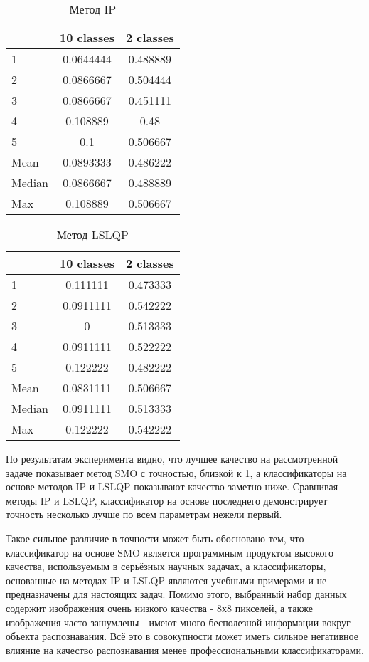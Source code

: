 \begin{table}[H]
    \centering
    \begin{tabular}{|l||c|c|}
        \hline
        & 10 classes & 2 classes \\\hline\hline
        1 & 0.0644444 & 0.488889 \\\hline
        2 & 0.0866667 & 0.504444 \\\hline
        3 & 0.0866667 & 0.451111 \\\hline
        4 & 0.108889 & 0.48 \\\hline
        5 & 0.1 & 0.506667 \\\hline
        Mean & 0.0893333 & 0.486222 \\\hline
        Median & 0.0866667 & 0.488889 \\\hline
        Max & 0.108889 & 0.506667 \\\hline
    \end{tabular}
    \caption{Метод IP}
\end{table}

\begin{table}[H]
    \centering
    \begin{tabular}{|l||c|c|}
        \hline
        & 10 classes & 2 classes \\\hline\hline
        1 & 0.111111 & 0.473333 \\\hline
        2 & 0.0911111 & 0.542222 \\\hline
        3 & 0 & 0.513333 \\\hline
        4 & 0.0911111 & 0.522222 \\\hline
        5 & 0.122222 & 0.482222 \\\hline
        Mean & 0.0831111 & 0.506667 \\\hline
        Median & 0.0911111 & 0.513333 \\\hline
        Max & 0.122222 & 0.542222 \\\hline
    \end{tabular}
    \caption{Метод LSLQP}
\end{table}

По результатам эксперимента видно, что лучшее качество на рассмотренной задаче показывает метод SMO с точностью, близкой к 1, а классификаторы на основе методов IP и LSLQP показывают качество заметно ниже. Сравнивая методы IP и LSLQP, классификатор на основе последнего демонстрирует точность несколько лучше по всем параметрам нежели первый.

Такое сильное различие в точности может быть обосновано тем, что классификатор на основе SMO является программным продуктом высокого качества, используемым в серьёзных научных задачах, а классификаторы, основанные на методах IP и LSLQP являются учебными примерами и не предназначены для настоящих задач. Помимо этого, выбранный набор данных содержит изображения очень низкого качества - 8х8 пикселей, а также изображения часто зашумлены - имеют много бесполезной информации вокруг объекта распознавания. Всё это в совокупности может иметь сильное негативное влияние на качество распознавания менее профессиональными классификаторами.
